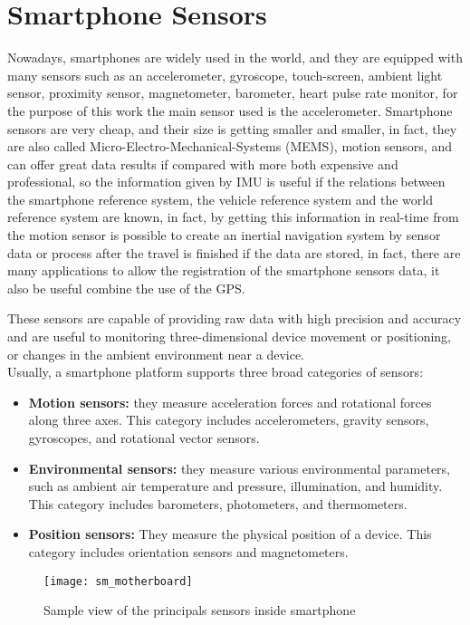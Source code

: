 \documentclass[tesi]{subfiles}
\begin{document}
\section{Smartphone Sensors}\label{sc:Smartphone Sensors}
Nowadays, smartphones are widely used in the world, and they are equipped with many sensors such as an accelerometer, gyroscope, touch-screen, ambient light sensor, proximity sensor, magnetometer, barometer, heart pulse rate monitor, for the purpose of this work the main sensor used is the accelerometer. Smartphone sensors are very cheap, and their size is getting smaller and smaller, in fact, they are also called Micro-Electro-Mechanical-Systems (MEMS), motion sensors, and can offer great data results if compared with more both expensive and professional, so the information given by IMU is useful if the relations between the smartphone reference system, the vehicle reference system and the world reference system are known, in fact, by getting this information in real-time from the motion sensor is possible to create an inertial navigation system by sensor data or process after the travel is finished if the data are stored, in fact, there are many applications to allow the registration of the smartphone sensors data, it also be useful combine the use of the GPS.

\noindent These sensors are capable of providing raw data with high precision and accuracy and are useful to monitoring three-dimensional device movement or positioning, or changes in the ambient environment near a device.\\
Usually, a smartphone platform supports three broad categories of sensors\cite{Andro}:
\begin{itemize}
	\item \textbf{Motion sensors:} they measure acceleration forces and rotational forces along three axes. This category includes accelerometers, gravity sensors, gyroscopes, and rotational vector sensors.
	\item \textbf{Environmental sensors:} they measure various environmental parameters, such as ambient air temperature and pressure, illumination, and humidity. This category includes barometers, photometers, and thermometers.
	\item \textbf{Position sensors:} They measure the physical position of a device. This category includes orientation sensors and magnetometers.
\end{itemize}

\vspace{1cm}
\begin{figure}[H]
\centering
\texttt{[image: sm\_motherboard]}
\caption{Sample view of the principals sensors inside smartphone}
\label{fig:Sample smartphone sensors}
\end{figure}
\end{document}
